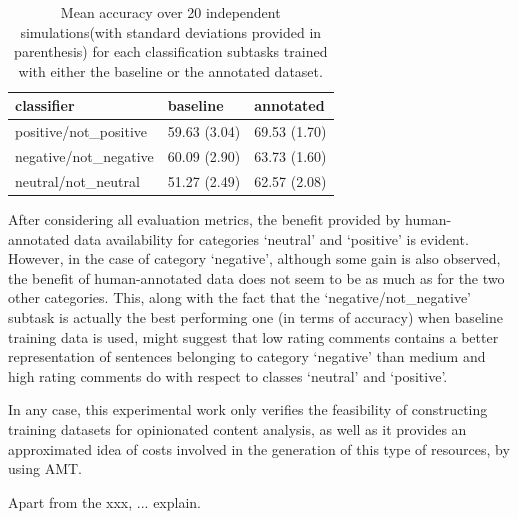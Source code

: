 \documentclass[11pt,letterpaper]{article}
\begin{document}
\begin{table}
\begin{table}
\begin{tabular}{|l|l|l|}
\hline
classifier &baseline &annotated \\ 
\hline
positive/not\_positive &59.63 (3.04) &69.53 (1.70) \\ 
\hline
negative/not\_negative &60.09 (2.90) &63.73 (1.60) \\ 
\hline
neutral/not\_neutral &51.27 (2.49) &62.57 (2.08) \\ 
\hline
\end{tabular}
\caption{Mean accuracy over 20 independent simulations(with standard deviations provided in parenthesis) 
for each classification subtasks trained with either the baseline or the annotated dataset.}
\label{tc_accu}
\end{table}

After considering all evaluation metrics, the benefit provided by human-annotated data 
availability for categories `neutral' and `positive' is evident. However, in the case of category `negative', although some 
gain is also observed, the benefit of human-annotated data does not seem to be as much as for the two other 
categories. This, along with the fact that the `negative/not\_negative' subtask is actually the best performing
one (in terms of accuracy) when baseline training data is used, might suggest that low rating comments contains 
a better representation of sentences belonging to category `negative' than medium and high rating comments do with
respect to classes `neutral' and `positive'. 

In any case, this experimental work only verifies the feasibility of constructing training datasets for
opinionated content analysis, as well as it provides an approximated idea of costs involved in the generation
of this type of resources, by using AMT.


Apart from the xxx, ... explain.




\end{table}
\end{document}
